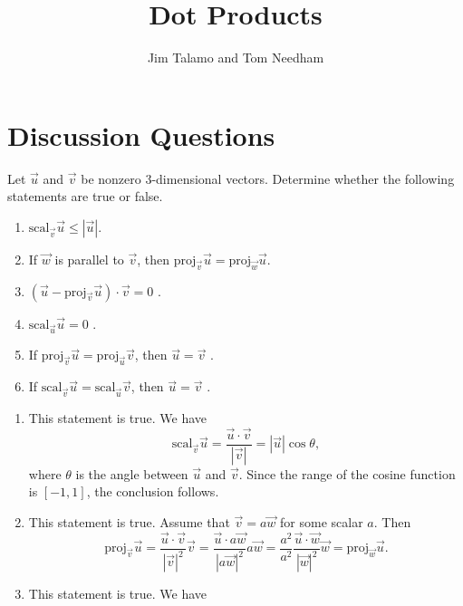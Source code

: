 \documentclass[noauthor,handout]{ximera}
\author{Jim Talamo and Tom Needham}
\title[Collaborate:]{Dot Products}
\begin{document}
\begin{abstract}
\end{abstract}
\maketitle

\section{Discussion Questions}

\begin{problem}
Let $\vec{u}$ and $\vec{v}$ be nonzero $3$-dimensional vectors. Determine whether the following statements are true or false. 

\begin{enumerate}[label=(\alph*)]
\item $\mathrm{scal}_{\vec{v}} \vec{u} \leq \left|\vec{u}\right|$.
\item If $\vec{w}$ is parallel to $\vec{v}$, then $\mathrm{proj}_\vec{v} \vec{u} = \mathrm{proj}_\vec{w} \vec{u}$.
\item $(\vec{u} - \mathrm{proj}_\vec{v} \vec{u}) \cdot \vec{v} = 0$ .
\item $\mathrm{scal}_\vec{u} \vec{u} = 0$ .
\item If $\mathrm{proj}_\vec{v} \vec{u} = \mathrm{proj}_\vec{u} \vec{v}$, then $\vec{u} = \vec{v}$ .
\item If $\mathrm{scal}_\vec{v} \vec{u} = \mathrm{scal}_\vec{u} \vec{v}$, then $\vec{u} = \vec{v}$ .
\end{enumerate}
\begin{freeResponse}
\begin{enumerate}[label=(\alph*)]
\item This statement is true. We have 
$$
\mathrm{scal}_{\vec{v}} \vec{u} = \frac{\vec{u} \cdot \vec{v}}{\left|\vec{v}\right|} = \left|\vec{u}\right| \cos \theta,
$$
where $\theta$ is the angle between $\vec{u}$ and $\vec{v}$. Since the range of the cosine function is $[-1,1]$, the conclusion follows.
\item This statement is true. Assume that $\vec{v} = a \vec{w}$ for some scalar $a$. Then
$$
\mathrm{proj}_\vec{v} \vec{u} = \frac{\vec{u} \cdot \vec{v}}{\left|\vec{v}\right|^2} \vec{v} = \frac{\vec{u} \cdot a \vec{w}}{\left|a \vec{w}\right|^2} a \vec{w} = \frac{a^2}{a^2} \frac{\vec{u} \cdot \vec{w}}{\left|\vec{w}\right|^2} \vec{w} = \mathrm{proj}_\vec{w} \vec{u}.
$$
\item This statement is true. We have

\end{enumerate}
\end{freeResponse}
\end{problem}
\end{document}
